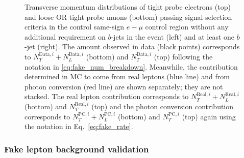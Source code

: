 \begin{figure}[tb]
{}
\caption{Transverse momentum distributions of tight probe 
electrons (top) and loose OR tight probe muons (bottom) passing signal 
selection criteria in the control same-sign $e-\mu$ control region 
without any additional requirement on $b$-jets in the event (left) and 
at least one $b$-jet (right). 
The amount observed in data (black points) corresponds 
to $N_T^{\textrm{Data},i}+N_L^{\textrm{Data},i}$ (bottom) and $N_T^{\textrm{Data},i}$ (top) following the notation
in \eqn\ref{eq:fake_num_breakdown}.
Meanwhile, the contribution determined in MC to come from 
real leptons (blue line) and from photon conversion (red line) are shown 
separately; they are not stacked. The real lepton contribution corresponds to 
$N_T^{\textrm{Real},i}+N_L^{\textrm{Real},i}$ (bottom) and $N_T^{\textrm{Real},i}$ 
(top) and the photon conversion 
contribution 
corresponds to $N_T^{\textrm{PC},i}+N_L^{\textrm{PC},i}$ (bottom) 
and $N_T^{\textrm{PC},i}$ (top) again using the notation 
in Eq.~\ref{eq:fake_rate}. }
\label{fig:fakeEff_CRs_electron}
\end{figure}


\subsubsection{Fake lepton background validation}



